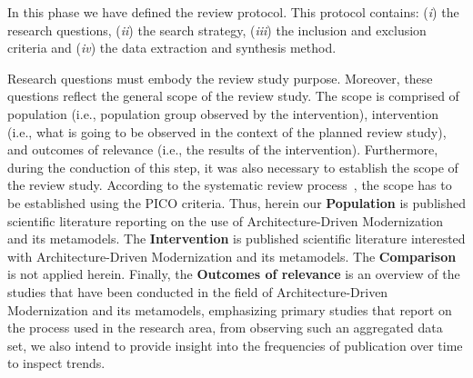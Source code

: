 In this phase we have defined the review protocol. This protocol contains: (\textit{i}) the research questions, (\textit{ii}) the search strategy, (\textit{iii}) the inclusion and exclusion criteria and (\textit{iv}) the data extraction and synthesis method.

Research questions must embody the review study purpose. Moreover, these questions reflect the general scope of the review study. The scope is comprised of population (i.e., population group observed by the intervention), intervention (i.e., what is going to be observed in the context of the planned review study), and outcomes of relevance (i.e., the results of the intervention). Furthermore, during the conduction of this step, it was also necessary to establish the scope of the review study. According to the systematic review process~\cite{Kitchenham}, the scope has to be established using the PICO criteria. Thus, herein our \textbf{Population} is published scientific literature reporting on the use of Architecture-Driven Modernization and its metamodels. The \textbf{Intervention} is published scientific literature interested with Architecture-Driven Modernization and its metamodels. The \textbf{Comparison} is not applied herein. Finally, the \textbf{Outcomes of relevance} is an overview of the studies that have been conducted in the field of Architecture-Driven Modernization and its metamodels, emphasizing primary studies that report on the process used in the research area, from observing such an aggregated data set, we also intend to provide insight into the frequencies of publication over time to inspect trends.   






